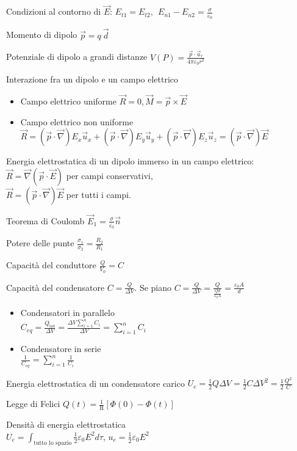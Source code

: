 \documentclass[10pt,a4paper]{article}
\begin{document}
\begin{multicols}{2}
Condizioni al contorno di $\vec{E}$: $E_{t1} =E_{t2} ,\ \ E_{n1} -E_{n2} =\frac{\sigma }{\varepsilon _{0}}$

Momento di dipolo $\vec{p} =q\ \vec{d}$

Potenziale di dipolo a grandi distanze $V(P)=\frac{\vec{p} \cdot \vec{u}_{r}}{4\pi \varepsilon _{0} r^{2}}$

Interazione fra un dipolo e un campo elettrico
\begin{itemize}
\item Campo elettrico uniforme $\vec{R} =0,\vec{M} =\vec{p} \times \vec{E}$
\item Campo elettrico non uniforme $\vec{R} =(\vec{p} \cdot \vec{\nabla }) E_{x}\vec{u}_{x} +(\vec{p} \cdot \vec{\nabla }) E_{y}\vec{u}_{y} +(\vec{p} \cdot \vec{\nabla }) E_{z}\vec{u}_{z} =(\vec{p} \cdot \vec{\nabla })\vec{E}$
\end{itemize}

Energia elettrostatica di un dipolo immerso in un campo elettrico: \\$\vec{R} =\vec{\nabla } (\vec{p} \cdot \vec{E} )$ per campi conservativi, \\$\vec{R} =(\vec{p} \cdot \vec{\nabla } )\vec{E}$ per tutti i campi.

Teorema di Coulomb $\vec{E}_{1} =\frac{\sigma }{\varepsilon _{0}}\vec{n}$

Potere delle punte $\frac{\sigma _{1}}{\sigma _{2}} =\frac{R_{2}}{R_{1}}$

Capacità del conduttore $\frac{Q}{V_{0}} =C$

Capacità del condensatore $C=\frac{Q}{\Delta V}$. Se piano $C=\frac{Q}{\Delta V} =\frac{Q}{\frac{Qd}{\varepsilon _{0} A}} =\frac{\varepsilon _{0} A}{d}$
\begin{itemize}
\item Condensatori in parallelo \\$C_{eq} =\frac{Q_{\text{tot}}}{\Delta V} =\frac{\Delta V\sum ^{n}_{i=1} C_{i}}{\Delta V} =\sum ^{n}_{i=1} C_{i}$
\item Condensatore in serie \\$\frac{1}{C_{eq}} =\sum ^{n}_{i=1}\frac{1}{C_{i}}$
\end{itemize}

Energia elettrostatica di un condensatore carico $U_{e} =\frac{1}{2} Q\Delta V=\frac{1}{2} C\Delta V^{2} =\frac{1}{2}\frac{Q^{2}}{C}$

Legge di Felici $Q(t)=\frac{1}{\mathrm{R}} [\Phi (0)-\Phi (t)]$

Densità di energia elettrostatica \\$U_{e} =\int _{\text{tutto lo spazio}}\frac{1}{2} \varepsilon _{0} E^{2} d\tau $, $u_{e} =\frac{1}{2} \varepsilon _{0} E^{2}$


\end{multicols}
\end{document}
